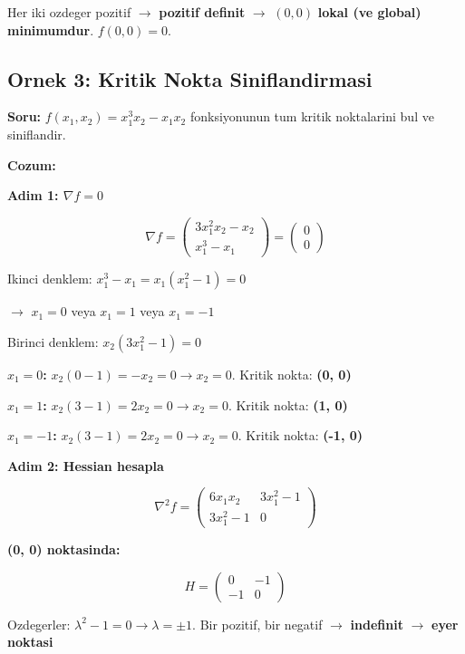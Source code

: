 \documentclass[12pt,a4paper]{article}
\theoremstyle{definition}
\theoremstyle{remark}
\begin{document}
Her iki ozdeger pozitif $\rightarrow$ \textbf{pozitif definit} $\rightarrow$ $(0, 0)$ \textbf{lokal (ve global) minimumdur}. $f(0,0) = 0$.

\subsection{Ornek 3: Kritik Nokta Siniflandirmasi}

\textbf{Soru:} $f(x_1, x_2) = x_1^3 x_2 - x_1 x_2$ fonksiyonunun tum kritik noktalarini bul ve siniflandir.

\bigskip
\textbf{Cozum:}

\textbf{Adim 1: $\nabla f = 0$}

\[
\nabla f = \begin{pmatrix} 3x_1^2 x_2 - x_2 \\ x_1^3 - x_1 \end{pmatrix} = \begin{pmatrix} 0 \\ 0 \end{pmatrix}
\]

Ikinci denklem: $x_1^3 - x_1 = x_1(x_1^2 - 1) = 0$

$\rightarrow$ $x_1 = 0$ veya $x_1 = 1$ veya $x_1 = -1$

Birinci denklem: $x_2(3x_1^2 - 1) = 0$

\textbf{$x_1 = 0$:} $x_2(0 - 1) = -x_2 = 0 \rightarrow x_2 = 0$. Kritik nokta: \textbf{(0, 0)}

\textbf{$x_1 = 1$:} $x_2(3 - 1) = 2x_2 = 0 \rightarrow x_2 = 0$. Kritik nokta: \textbf{(1, 0)}

\textbf{$x_1 = -1$:} $x_2(3 - 1) = 2x_2 = 0 \rightarrow x_2 = 0$. Kritik nokta: \textbf{(-1, 0)}

\textbf{Adim 2: Hessian hesapla}

\[
\nabla^2 f = \begin{pmatrix} 6x_1 x_2 & 3x_1^2 - 1 \\ 3x_1^2 - 1 & 0 \end{pmatrix}
\]

\textbf{(0, 0) noktasinda:}

\[
H = \begin{pmatrix} 0 & -1 \\ -1 & 0 \end{pmatrix}
\]

Ozdegerler: $\lambda^2 - 1 = 0 \rightarrow \lambda = \pm 1$. Bir pozitif, bir negatif $\rightarrow$ \textbf{indefinit} $\rightarrow$ \textbf{eyer noktasi}
\end{document}

